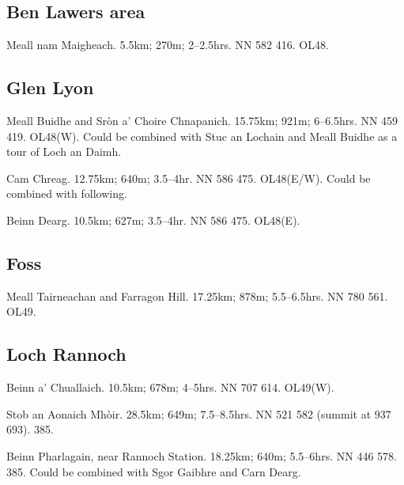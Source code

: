 
\subsection{Ben Lawers area}

\begin{munros}
\item
Meall nam Maigheach.  5.5km; 270m; 2--2.5hrs.  NN 582 416.  OL48.
\end{munros}


\subsection{Glen Lyon}

\begin{munros}
\item
Meall Buidhe and Sròn a' Choire Chnapanich.  15.75km; 921m; 6--6.5hrs.
NN 459 419.  OL48(W).  Could be combined with Stuc an Lochain and Meall Buidhe as
a tour of Loch an Daimh.

\item
Cam Chreag.  12.75km; 640m; 3.5--4hr.  NN 586 475.  OL48(E/W).  Could be combined
with following. 

\item
Beinn Dearg.  10.5km; 627m; 3.5--4hr. NN 586 475.  OL48(E). 
\end{munros}

\subsection{Foss}

\begin{munros}
\item
Meall Tairneachan and Farragon Hill.  17.25km; 878m; 5.5--6.5hrs.  NN 780 561.
OL49.
\end{munros}


\subsection{Loch Rannoch}

\begin{munros}
\item
Beinn a' Chuallaich.  10.5km; 678m; 4--5hrs.  NN 707 614.  OL49(W). 

\item
Stob an Aonaich Mhòir.  28.5km; 649m; 7.5--8.5hrs.  NN 521 582 (summit at 937
693).  385.

\item\target
Beinn Pharlagain, near Rannoch Station.  18.25km; 640m; 5.5--6hrs.  NN 446
578.  385.  Could be combined with Sgor Gaibhre and Carn Dearg.  
\end{munros}
